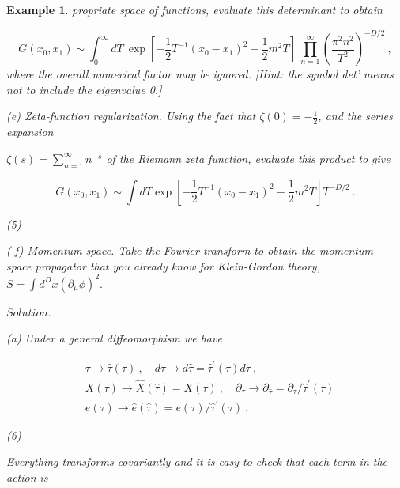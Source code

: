 \documentclass[10pt,
 article,
 amsmath,amssymb
]{revtex4-2}
\newtheorem{example}[theorem]{Example}
\begin{document}
\begin{example}
propriate space of functions, evaluate this determinant to obtain

$$G(x_0,x_1)\sim\int_0^\infty dT\:\exp{[-\frac12T^{-1}(x_0-x_1)^2-\frac12m^2T]}\:\prod_{n=1}^\infty\left(\frac{\pi^2n^2}{T^2}\right)^{-D/2}\:,$$
where the overall numerical factor may be ignored.
[Hint: the symbol det' means not to include the eigenvalue 0.]

(e) Zeta-function regularization. Using the fact that $\zeta(0)=-\frac12$, and the series expansion

$\zeta(s)=\sum_{n=1}^\infty n^{-s}$ of the Riemann zeta function, evaluate this product to give

$$G(x_0,x_1)\sim\int dT\exp\left[-\frac12T^{-1}(x_0-x_1)^2-\frac12m^2T\right]T^{-D/2}\:.$$

(5)

( f) Momentum space. Take the Fourier transform to obtain the momentum- space propagator
that you already know for Klein-Gordon theory, $S=\int d^Dx\left(\partial_\mu\phi\right)^2.$

$\textit{Solution. }$

(a) Under a general diffeomorphism we have

$$\begin{aligned}&\tau\to\hat{\tau}(\tau)\:,\quad d\tau\to d\hat{\tau}=\hat{\tau}^{\prime}(\tau)d\tau\:,\\&X(\tau)\to\hat{X}(\hat{\tau})=X(\tau)\:,\quad\partial_{\tau}\to\partial_{\hat{\tau}}=\partial_{\tau}/\hat{\tau}^{\prime}(\tau)\\&e(\tau)\to\hat{e}(\hat{\tau})=e(\tau)/\hat{\tau}^{\prime}(\tau)\:.\end{aligned}$$

(6)

Everything transforms covariantly and it is easy to check that each term in the action is


\end{example}
\end{document}
